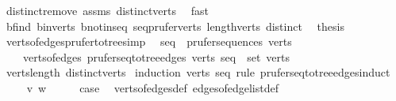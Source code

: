 \begin{isabellebody}
\ distinct{\isacharunderscore}{\kern0pt}remove{}\ assms\ distinct{\isacharunderscore}{\kern0pt}verts\ \isamarkupfalse%
\ fast\isanewline
\ \ \isamarkupfalse%
\ b{\isacharunderscore}{\kern0pt}find\ b{\isacharunderscore}{\kern0pt}in{\isacharunderscore}{\kern0pt}verts\ b{\isacharunderscore}{\kern0pt}not{\isacharunderscore}{\kern0pt}in{\isacharunderscore}{\kern0pt}seq\ seq{\isacharunderscore}{\kern0pt}prufer{\isacharunderscore}{\kern0pt}verts{\isacharprime}{\kern0pt}\ length{\isacharunderscore}{\kern0pt}verts{\isacharprime}{\kern0pt}\ distinct\ \isamarkupfalse%
\ {\isacharquery}{\kern0pt}thesis\ \isacommand{{\isachardot}{\kern0pt}{\isachardot}{\kern0pt}}\isamarkupfalse%
\isanewline
{}\isamarkupfalse%
%
\endisatagproof
{\isafoldproof}%
%
\isadelimproof
\isanewline
%
\endisadelimproof
\isanewline
{}\isamarkupfalse%
\ verts{\isacharunderscore}{\kern0pt}of{\isacharunderscore}{\kern0pt}edges{\isacharunderscore}{\kern0pt}prufer{\isacharunderscore}{\kern0pt}to{\isacharunderscore}{\kern0pt}tree{\isacharbrackleft}{\kern0pt}simp{\isacharbrackright}{\kern0pt}{\isacharcolon}{\kern0pt}\isanewline
\ \ {\isachardoublequoteopen}seq\ {\isasymin}\ prufer{\isacharunderscore}{\kern0pt}sequences\ verts\ {\isasymLongrightarrow}\isanewline
\ \ \ \ verts{\isacharunderscore}{\kern0pt}of{\isacharunderscore}{\kern0pt}edges\ {\isacharparenleft}{\kern0pt}prufer{\isacharunderscore}{\kern0pt}seq{\isacharunderscore}{\kern0pt}to{\isacharunderscore}{\kern0pt}tree{\isacharunderscore}{\kern0pt}edges\ verts\ seq{\isacharparenright}{\kern0pt}\ {\isacharequal}{\kern0pt}\ set\ verts{\isachardoublequoteclose}\isanewline
%
\isadelimproof
\ \ %
\endisadelimproof
%
\isatagproof
{}\isamarkupfalse%
\ verts{\isacharunderscore}{\kern0pt}length\ distinct{\isacharunderscore}{\kern0pt}verts\isanewline
{}\isamarkupfalse%
\ {\isacharparenleft}{\kern0pt}induction\ verts\ seq\ rule{\isacharcolon}{\kern0pt}\ prufer{\isacharunderscore}{\kern0pt}seq{\isacharunderscore}{\kern0pt}to{\isacharunderscore}{\kern0pt}tree{\isacharunderscore}{\kern0pt}edges{\isachardot}{\kern0pt}induct{\isacharparenright}{\kern0pt}\isanewline
\ \ \isamarkupfalse%
\ {\isacharparenleft}{\kern0pt}{}\ v\ w{\isacharparenright}{\kern0pt}\isanewline
\ \ \isamarkupfalse%
\ \isamarkupfalse%
\ {\isacharquery}{\kern0pt}case\ \isamarkupfalse%
\ verts{\isacharunderscore}{\kern0pt}of{\isacharunderscore}{\kern0pt}edges{\isacharunderscore}{\kern0pt}def\ edges{\isacharunderscore}{\kern0pt}of{\isacharunderscore}{\kern0pt}edge{\isacharunderscore}{\kern0pt}list{\isacharunderscore}{\kern0pt}def\ \isamarkupfalse%

\end{isabellebody}
